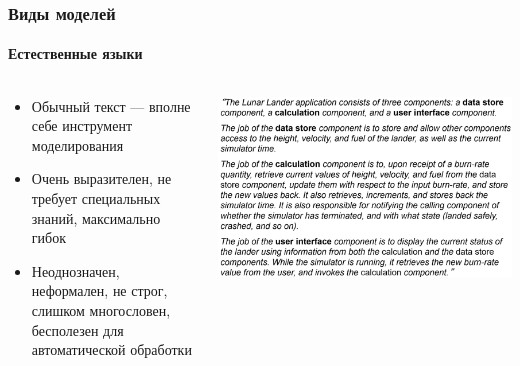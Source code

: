 \documentclass{../../slides-style}
\begin{document}
    \begin{frame}
        \frametitle{Виды моделей}
        \framesubtitle{Естественные языки}
        \begin{columns}
            \begin{column}{0.5\textwidth}
                \begin{itemize}
                    \item Обычный текст --- вполне себе инструмент моделирования
                    \item Очень выразителен, не требует специальных знаний, максимально гибок
                    \item Неоднозначен, неформален, не строг, слишком многословен, бесполезен для автоматической обработки
                \end{itemize}
            \end{column}
            \begin{column}{0.5\textwidth}
                \begin{center}
                    \includegraphics[width=\textwidth]{naturalLanguage.png}
                \end{center}
            \end{column}
        \end{columns}
    \end{frame}
\end{document}
